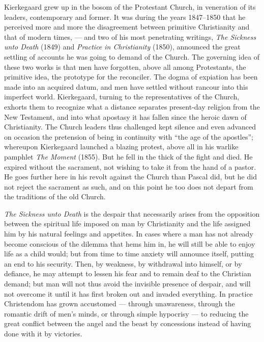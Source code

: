 \documentclass[12pt,a4paper]{article}
\newcommand{\opage}[1]{\marginnote{\footnotesize\textit{[#1]}}}
\begin{document}
Kierkegaard grew up in the bosom of the Protestant Church, in veneration of its
leaders, contemporary and former. It was during the years 1847--1850 that he
perceived more and more the disagreement between primitive Christianity and
that of modern times, --- and two of his most penetrating writings, \emph{The
Sickness unto Death} (1849) and \emph{Practice in Christianity} (1850),
announced the great settling of accounts he was going to demand of the Church.
The governing idea of these two works is that men have forgotten, above all
among Protestants, the primitive idea, the prototype for the reconciler. The
dogma of expiation has been made into an acquired datum, and men have settled
without rancour into this imperfect world. Kierkegaard, turning to the
representatives of the Church, exhorts them to recognize what a distance
separates present-day religion from the New Testament, and into what apostasy it
has fallen since the heroic dawn of Christianity. The Church leaders thus
challenged kept silence and even advanced on occasion the pretension of being in
continuity with ``the age of the apostles''; whereupon Kierkegaard launched a
blazing protest, above all in his warlike pamphlet \emph{The Moment} (1855). But
he fell in the thick of the fight and died. He expired without the sacrament,
not wishing to take it from the hand of a pastor. He goes further here in his
revolt against the Church than Pascal did, but he did not reject the sacrament
as such, and on this point he too does not depart from the traditions of the old
Church.

\emph{The Sickness unto Death} is the despair that necessarily arises from the
opposition between the spiritual life imposed on man by Christianity
and the life assigned him by his natural feelings and appetites. In cases where
a man has not already become conscious of the dilemma that hems him in, he will
still be able to enjoy life as a child would; but from time to time anxiety will
announce itself, putting an end to
\opage{240}his security. Then, by weakness, by withdrawal into himself, or by defiance, he
may attempt to lessen his fear and to remain deaf to the Christian demand; but
man will not thus avoid the invisible presence of despair, and will not overcome
it until it has first broken out and invaded everything. In practice Christendom
has grown accustomed --- through unawareness, through the romantic drift of
men's minds, or through simple hypocrisy --- to reducing the great conflict
between the angel and the beast by concessions instead of having done with it by
victories.
\end{document}

